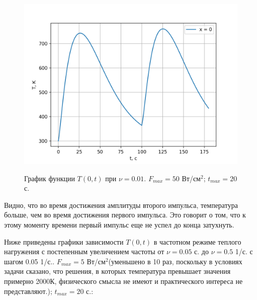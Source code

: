 \documentclass[a4paper,12pt]{article}
\begin{document}
	\begin{figure}[h!]
		\begin{center}
			{\includegraphics[scale = 0.7]{nu=0.01.png}}
		\end{center}
		\caption{График функции $T(0, t)$ при $\nu=0.01$. $F_{max}=50$ Вт/см$^2$; $t_{max} = 20$ с.}
		\label{ris:nu=0.01}
	\end{figure}

	Видно, что во время достижения амплитуды второго импульса, температура больше, чем во время достижения первого импульса. Это говорит о том, что к этому моменту времени первый импульс еще не успел до конца затухнуть.
	
	\newpage
	
	Ниже приведены графики зависимости $T(0, t)$ в частотном режиме теплого нагружения с постепенным увеличением частоты от $\nu = 0.05$ с. до $\nu = 0.5$ 1/с. с шагом 0.05 1/с.. $F_{max}=5$ Вт/см$^2$(уменьшено в 10 раз, поскольку в условиях задачи сказано, что решения, в которых температура превышает значения примерно 2000К, физического смысла не имеют и практического интереса не представляют.); $t_{max} = 20$ с.:
	
\end{document}
